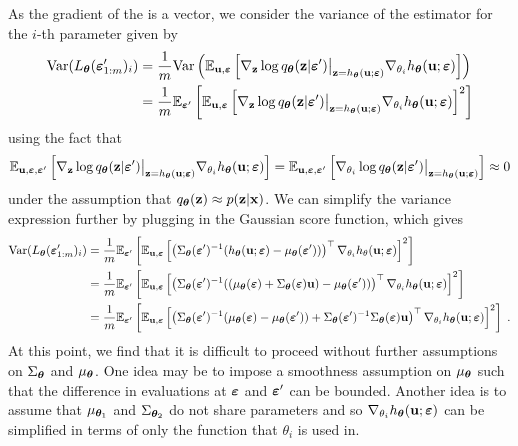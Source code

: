 \documentclass[10pt]{article}
\begin{document}
As the gradient of the \elbo is a vector, we consider the variance of the estimator for the $i$-th parameter given by
\begin{align*}
\mathrm{Var}(L_{\bm{\theta}}(\bm{\varepsilon}_{1:m}')_i) &= \frac{1}{m}\mathrm{Var}\left(\mathbb{E}_{\mathbf{u},\bm{\varepsilon}}\left[\nabla_{\mathbf{z}}\log q_{\bm{\theta}}(\mathbf{z}|\bm{\varepsilon}')\big|_{\mathbf{z}=h_{\bm{\theta}}(\mathbf{u};\bm{\varepsilon})} \nabla_{\theta_i} h_{\bm{\theta}}(\mathbf{u};\bm{\varepsilon})\right]\right) \\
&= \frac{1}{m}\mathbb{E}_{\bm{\varepsilon}'}\left[\mathbb{E}_{\mathbf{u},\bm{\varepsilon}}\left[\nabla_{\mathbf{z}}\log q_{\bm{\theta}}(\mathbf{z}|\bm{\varepsilon}')\big|_{\mathbf{z}=h_{\bm{\theta}}(\mathbf{u};\bm{\varepsilon})} \nabla_{\theta_i} h_{\bm{\theta}}(\mathbf{u};\bm{\varepsilon})\right]^2\right]
\end{align*}
using the fact that
\[
\mathbb{E}_{\mathbf{u},\bm{\varepsilon},\bm{\varepsilon}'}\left[\nabla_{\mathbf{z}}\log q_{\bm{\theta}}(\mathbf{z}|\bm{\varepsilon}')\big|_{\mathbf{z}=h_{\bm{\theta}}(\mathbf{u};\bm{\varepsilon})} \nabla_{\theta_i} h_{\bm{\theta}}(\mathbf{u};\bm{\varepsilon})\right] = \mathbb{E}_{\mathbf{u},\bm{\varepsilon},\bm{\varepsilon}'}\left[\nabla_{\theta_i}\log q_{\bm{\theta}}(\mathbf{z}|\bm{\varepsilon}')\big|_{\mathbf{z}=h_{\bm{\theta}}(\mathbf{u};\bm{\varepsilon})}\right] \approx 0
\]
under the assumption that $q_{\bm{\theta}}(\mathbf{z})\approx p(\mathbf{z}|\mathbf{x})$. We can simplify the variance expression further by plugging in the Gaussian score function, which gives
\begin{align*}
\mathrm{Var}(L_{\bm{\theta}}(\bm{\varepsilon}_{1:m}')_i) &= \frac{1}{m}\mathbb{E}_{\bm{\varepsilon}'}\left[\mathbb{E}_{\mathbf{u},\bm{\varepsilon}}\left[\left(\Sigma_{\bm{\theta}}(\bm{\varepsilon}')^{-1}(h_{\bm{\theta}}(\mathbf{u};\bm{\varepsilon})-\mu_{\bm{\theta}}(\bm{\varepsilon}'))\right)^\top\nabla_{\theta_i} h_\theta(\mathbf{u};\bm{\varepsilon})\right]^2\right] \\
&= \frac{1}{m}\mathbb{E}_{\bm{\varepsilon}'}\left[\mathbb{E}_{\mathbf{u},\bm{\varepsilon}}\left[\left(\Sigma_{\bm{\theta}}(\bm{\varepsilon}')^{-1}(\left(\mu_{\bm{\theta}}(\bm{\varepsilon})+\Sigma_{\bm{\theta}}(\bm{\varepsilon})\mathbf{u}\right)-\mu_{\bm{\theta}}(\bm{\varepsilon}'))\right)^\top\nabla_{\theta_i} h_{\bm{\theta}}(\mathbf{u};\bm{\varepsilon})\right]^2\right] \\
&= \frac{1}{m}\mathbb{E}_{\bm{\varepsilon}'}\left[\mathbb{E}_{\mathbf{u},\bm{\varepsilon}}\left[\left(\Sigma_{\bm{\theta}}(\bm{\varepsilon}')^{-1}(\mu_{\bm{\theta}}(\bm{\varepsilon})-\mu_{\bm{\theta}}(\bm{\varepsilon}'))+\Sigma_{\bm{\theta}}(\bm{\varepsilon}')^{-1}\Sigma_{\bm{\theta}}(\bm{\varepsilon})\mathbf{u}\right)^\top\nabla_{\theta_i} h_{\bm{\theta}}(\mathbf{u};\bm{\varepsilon})\right]^2\right] \;.
\end{align*}
At this point, we find that it is difficult to proceed without further assumptions on $\Sigma_{\bm{\theta}}$ and $\mu_{\bm{\theta}}$. One idea may be to impose a smoothness assumption on $\mu_{\bm{\theta}}$ such that the difference in evaluations at $\bm{\varepsilon}$ and $\bm{\varepsilon}'$ can be bounded. Another idea is to assume that $\mu_{{\bm{\theta}}_1}$ and $\Sigma_{{\bm{\theta}}_2}$ do not share parameters and so $\nabla_{\theta_i}h_{\bm{\theta}}(\mathbf{u};\bm{\varepsilon})$ can be simplified in terms of only the function that $\theta_i$ is used in.
\\
\end{document}
